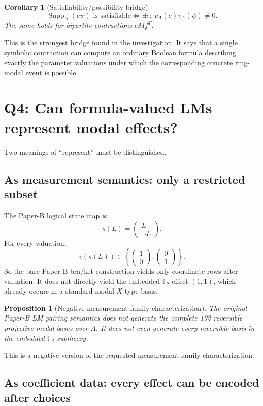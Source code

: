 \documentclass[11pt]{article}
\newtheorem{proposition}[theorem]{Proposition}
\newtheorem{corollary}[theorem]{Corollary}
\theoremstyle{definition}
\newcommand{\F}{\mathbb{F}}
\newcommand{\Supp}{\operatorname{Supp}_A}
\begin{document}
\begin{corollary}[Satisfiability/possibility bridge]
\[
\Supp(e\psi)\text{ is satisfiable}
\iff
\exists v:\;v_A(e)v_A(\psi)\neq0.
\]
The same holds for bipartite contractions \(eMf^T\).
\end{corollary}

This is the strongest bridge found in the investigation. It says that a single symbolic contraction can
compute an ordinary Boolean formula describing exactly the parameter valuations under which the
corresponding concrete ring-modal event is possible.

\section{Q4: Can formula-valued LMs represent modal effects?}

Two meanings of ``represent'' must be distinguished.

\subsection{As measurement semantics: only a restricted subset}

The Paper-B logical state map is
\[
s(L)=\begin{pmatrix}L\\\neg L\end{pmatrix}.
\]
For every valuation,
\[
v(s(L))\in
\left\{
\begin{pmatrix}1\\0\end{pmatrix},
\begin{pmatrix}0\\1\end{pmatrix}
\right\}.
\]
So the bare Paper-B bra/ket construction yields only coordinate rows after valuation. It does not
directly yield the embedded-\(\F_2\) effect \((1,1)\), which already occurs in a standard modal
\(X\)-type basis.

\begin{proposition}[Negative measurement-family characterization]
The original Paper-B LM pairing semantics does not generate the complete 192 reversible projective
modal bases over \(A\). It does not even generate every reversible basis in the embedded
\(\F_2\) subtheory.
\end{proposition}

This is a negative version of the requested measurement-family characterization.

\subsection{As coefficient data: every effect can be encoded after choices}
\end{document}
